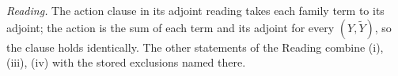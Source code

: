 \emph{Reading.} The action clause in its adjoint reading takes each family term to its adjoint; the action is the sum of each term and its adjoint for every $(Y, \tilde{Y})$, so the clause holds identically. The other statements of the Reading combine (i), (iii), (iv) with the stored exclusions named there.
